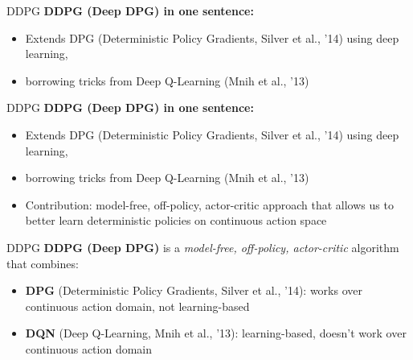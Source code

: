 \begin{frame}{DDPG}
\vspace{1em}
\textbf{DDPG (Deep DPG) in one sentence:}
\begin{itemize}
    \item Extends DPG (Deterministic Policy Gradients, Silver et al., '14) using deep learning,
    \item borrowing tricks from Deep Q-Learning (Mnih et al., '13)
\end{itemize}
\end{frame}

\begin{frame}{DDPG}
\vspace{1em}
\textbf{DDPG (Deep DPG) in one sentence:}
\begin{itemize}
    \item Extends DPG (Deterministic Policy Gradients, Silver et al., '14) using deep learning,
    \item borrowing tricks from Deep Q-Learning (Mnih et al., '13)
    \item Contribution: model-free, off-policy, actor-critic approach that allows us to better learn deterministic policies on continuous action space
\end{itemize}
\end{frame}

\begin{frame}{DDPG}
\vspace{1em}
\textbf{DDPG (Deep DPG)} is a \emph{model-free, off-policy, actor-critic} algorithm that combines:
\begin{itemize}
    \item \textbf{DPG} (Deterministic Policy Gradients, Silver et al., '14): works over continuous action domain, not learning-based
    \item \textbf{DQN} (Deep Q-Learning, Mnih et al., '13): learning-based, doesn't work over continuous action domain
\end{itemize}
\end{frame}

